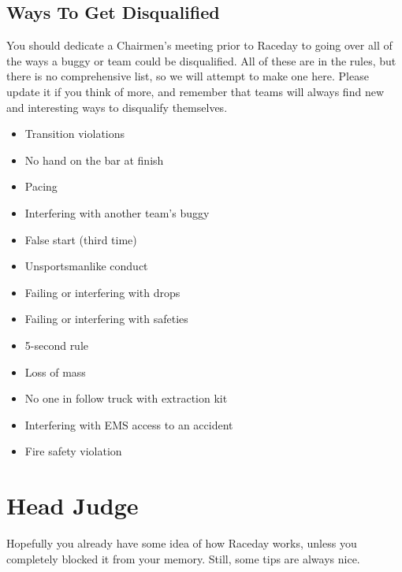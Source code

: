 \subsection{Ways To Get Disqualified}
You should dedicate a Chairmen's meeting prior to Raceday to going over all
of the ways a buggy or team could be disqualified. All of these are in the
rules, but there is no comprehensive list, so we will attempt to make one
here. Please update it if you think of more, and remember that teams will
always find new and interesting ways to disqualify themselves.
\begin{itemize}
\item Transition violations
\item No hand on the bar at finish
\item Pacing
\item Interfering with another team's buggy
\item False start (third time)
\item Unsportsmanlike conduct
\item Failing or interfering with drops
\item Failing or interfering with safeties
\item 5-second rule
\item Loss of mass
\item No one in follow truck with extraction kit
\item Interfering with EMS access to an accident
\item Fire safety violation

\end{itemize}

\section{Head Judge}
Hopefully you already have some idea of how Raceday works, unless you
completely blocked it from your memory. Still, some tips are always nice.
